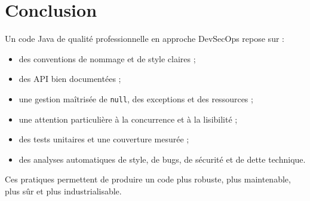 \documentclass[a4paper,11pt]{report}
\begin{document}
\chapter{Conclusion}

Un code Java de qualité professionnelle en approche DevSecOps repose sur :
\begin{itemize}
    \item des conventions de nommage et de style claires ;
    \item des API bien documentées ;
    \item une gestion maîtrisée de \texttt{null}, des exceptions et des ressources ;
    \item une attention particulière à la concurrence et à la lisibilité ;
    \item des tests unitaires et une couverture mesurée ;
    \item des analyses automatiques de style, de bugs, de sécurité et de dette technique.
\end{itemize}

Ces pratiques permettent de produire un code plus robuste, plus maintenable, plus sûr et plus industrialisable.
\end{document}
